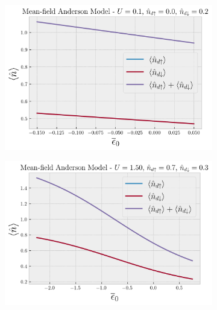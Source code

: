 \documentclass[a4paper,fleqn,12pt]{article}
\begin{document}
\begin{figure}[H]
\centering
\begin{subfigure}{.5\textwidth}
  \centering
  \includegraphics[width=\linewidth]{fig/plot-U_0.1-up_0.0-down_0.2.png}
\end{subfigure}%
\begin{subfigure}{.5\textwidth}
  \centering
  \includegraphics[width=\linewidth]{fig/plot-U_1.5-up_0.7-down_0.3.png}
\end{subfigure}
\end{figure}
\end{document}
